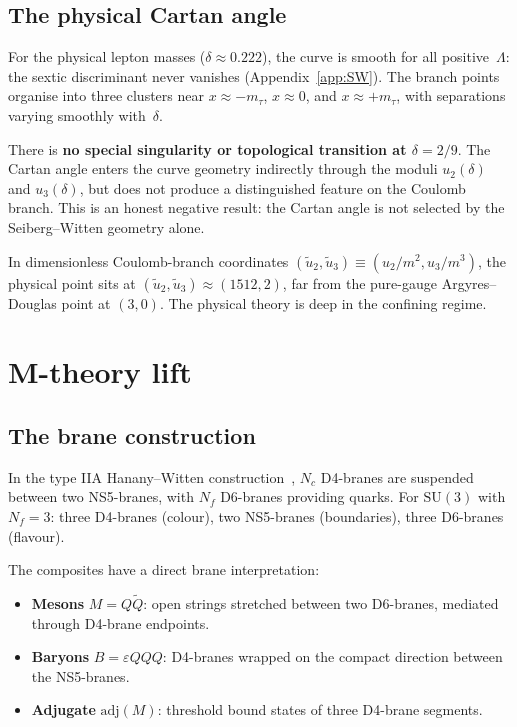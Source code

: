 \documentclass[aps,prd,twocolumn,showpacs,preprintnumbers,superscriptaddress,floatfix]{revtex4-2}
\newcommand{\SU}{\mathrm{SU}}
\newcommand{\Nf}{N_{\!f}}
\newcommand{\Nc}{N_{\!c}}
\newcommand{\adj}{\mathrm{adj}}
\begin{document}
\subsection{The physical Cartan angle}

For the physical lepton masses ($\delta \approx 0.222$), the curve
is smooth for all positive~$\Lambda$: the sextic discriminant never
vanishes (Appendix~\ref{app:SW}).
The branch points organise into three clusters near
$x \approx -m_\tau$, $x \approx 0$, and $x \approx +m_\tau$, with
separations varying smoothly with~$\delta$.

There is \textbf{no special singularity or topological transition at
$\delta = 2/9$}.
The Cartan angle enters the curve geometry indirectly through the
moduli $u_2(\delta)$ and $u_3(\delta)$, but does not produce a
distinguished feature on the Coulomb branch.
This is an honest negative result: the Cartan angle is not selected
by the Seiberg--Witten geometry alone.

In dimensionless Coulomb-branch coordinates
$(\tilde{u}_2, \tilde{u}_3) \equiv (u_2/m^2, u_3/m^3)$, the
physical point sits at $(\tilde{u}_2, \tilde{u}_3) \approx (1512, 2)$,
far from the pure-gauge Argyres--Douglas point at $(3, 0)$.
The physical theory is deep in the confining regime.


\section{M-theory lift}
\label{sec:Mtheory}

\subsection{The brane construction}

In the type IIA Hanany--Witten
construction~\cite{HananyWitten:1997}, $\Nc$ D4-branes are
suspended between two NS5-branes, with $\Nf$ D6-branes providing
quarks.
For $\SU(3)$ with $\Nf = 3$: three D4-branes (colour), two
NS5-branes (boundaries), three D6-branes (flavour).

The composites have a direct brane interpretation:
\begin{itemize}
  \item \textbf{Mesons} $M = Q\tilde{Q}$: open strings stretched
    between two D6-branes, mediated through D4-brane endpoints.
  \item \textbf{Baryons} $B = \varepsilon QQQ$: D4-branes wrapped
    on the compact direction between the NS5-branes.
  \item \textbf{Adjugate} $\adj(M)$: threshold bound states of
    three D4-brane segments.
\end{itemize}
\end{document}
